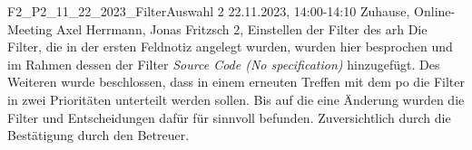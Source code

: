 \fieldnote
{F2\_P2\_11\_22\_2023\_FilterAuswahl}
{2}
{22.11.2023, 14:00-14:10}
{Zuhause, Online-Meeting}
{Axel Herrmann, Jonas Fritzsch}
{2, Einstellen der Filter des \gls{arh}}
{
	Die Filter, die in der ersten Feldnotiz angelegt wurden, wurden hier besprochen und im Rahmen dessen der Filter \emph{Source Code (No specification)} hinzugefügt.
  Des Weiteren wurde beschlossen, dass in einem erneuten Treffen mit dem \gls{po} die Filter in zwei Prioritäten unterteilt werden sollen.
}
{}
{Bis auf die eine Änderung wurden die Filter und Entscheidungen dafür für sinnvoll befunden.}
{}
{Zuversichtlich durch die Bestätigung durch den Betreuer.}